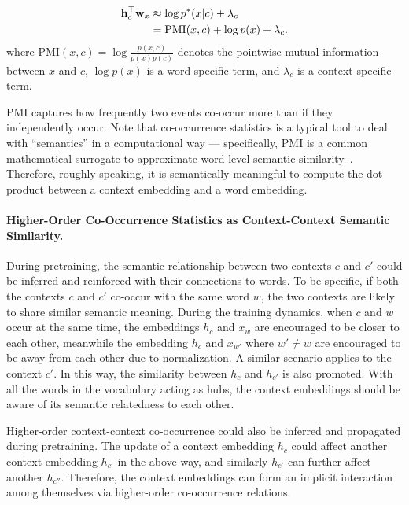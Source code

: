 \documentclass[11pt,a4paper]{article}
\def\rvh{{\mathbf{h}}}
\def\rvw{{\mathbf{w}}}
\begin{document}
\begin{align}
    \vspace{-10pt}
    \rvh_{c}^\top \rvw_{x} &\approx  \log p^* (x | c) + \lambda_{c}  \\
    &= \textrm{PMI}(x, c) + \log p(x) + \lambda_{c} . \label{eq:pmi}  
\end{align}
where $\textrm{PMI}(x, c) = \log \frac{p(x, c)}{p(x) p(c)}$ denotes the pointwise mutual information between $x$ and $c$, $\log p(x)$ is a word-specific term, and $\lambda_{c}$ is a context-specific term.

PMI captures how frequently two events co-occur more than if they independently occur. Note that co-occurrence statistics is a typical tool to deal with ``semantics'' in a computational way --- specifically, PMI is a common mathematical surrogate to approximate word-level semantic similarity~\cite{levy2014neural,ethayarajh2019towards}. Therefore, roughly speaking, it is semantically meaningful to compute the dot product between a context embedding and a word embedding. 


\paragraph{Higher-Order Co-Occurrence Statistics as Context-Context Semantic Similarity.}
During pretraining, the semantic relationship between two contexts $c$ and $c'$ could be inferred and reinforced with their connections to words. To be specific, if both the contexts $c$ and $c'$ co-occur with the same word $w$, the two contexts are likely to share similar semantic meaning. During the training dynamics, when $c$ and $w$ occur at the same time, the embeddings $h_c$ and $x_w$ are encouraged to be closer to each other, meanwhile the embedding $h_c$ and $x_{w'}$ where $w' \neq w$ are encouraged to be away from each other due to normalization. A similar scenario applies to the context $c'$. In this way, the similarity between $h_{c}$ and $h_{c'}$ is also promoted. With all the words in the vocabulary acting as hubs, the context embeddings should be aware of its semantic relatedness to each other. 

Higher-order context-context co-occurrence could also be inferred and propagated during pretraining. The update of a context embedding $h_c$ could affect another context embedding $h_{c'}$ in the above way, and similarly $h_{c'}$ can further affect another $h_{c''}$. Therefore, the context embeddings can form an implicit interaction among themselves via higher-order co-occurrence relations.
\end{document}
